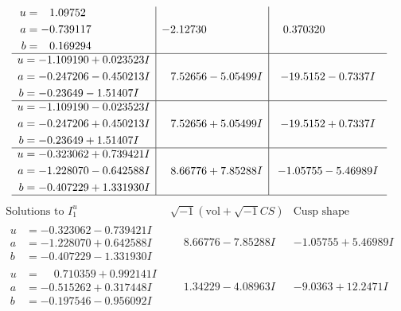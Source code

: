 \documentclass[1p]{elsarticle_modified}
\theoremstyle{definition}
\newcommand{\I}{\sqrt{-1}}
\begin{document}
$$\begin{array}{c|c|c}
\begin{aligned}
u &= \phantom{-}1.09752\phantom{ +0.000000I} \\
a &= -0.739117\phantom{ +0.000000I} \\
b &= \phantom{-}0.169294\phantom{ +0.000000I}\end{aligned}
 & -2.12730\phantom{ +0.000000I} & \phantom{-}0.370320\phantom{ +0.000000I} \\ \hline\begin{aligned}
u &= -1.109190 + 0.023523 I \\
a &= -0.247206 - 0.450213 I \\
b &= -0.23649 - 1.51407 I\end{aligned}
 & \phantom{-}7.52656 - 5.05499 I & -19.5152 - 0.7337 I \\ \hline\begin{aligned}
u &= -1.109190 - 0.023523 I \\
a &= -0.247206 + 0.450213 I \\
b &= -0.23649 + 1.51407 I\end{aligned}
 & \phantom{-}7.52656 + 5.05499 I & -19.5152 + 0.7337 I \\ \hline\begin{aligned}
u &= -0.323062 + 0.739421 I \\
a &= -1.228070 - 0.642588 I \\
b &= -0.407229 + 1.331930 I\end{aligned}
 & \phantom{-}8.66776 + 7.85288 I & -1.05755 - 5.46989 I\\
 \hline 
 \end{array}$$\newpage$$\begin{array}{c|c|c}  
\text{Solutions to }I^u_{1}& \I (\text{vol} + \sqrt{-1}CS) & \text{Cusp shape}\\
 \hline 
\begin{aligned}
u &= -0.323062 - 0.739421 I \\
a &= -1.228070 + 0.642588 I \\
b &= -0.407229 - 1.331930 I\end{aligned}
 & \phantom{-}8.66776 - 7.85288 I & -1.05755 + 5.46989 I \\ \hline\begin{aligned}
u &= \phantom{-}0.710359 + 0.992141 I \\
a &= -0.515262 + 0.317448 I \\
b &= -0.197546 - 0.956092 I\end{aligned}
 & \phantom{-}1.34229 - 4.08963 I & -9.0363 + 12.2471 I \\ \hline\begin{aligned}

\end{aligned}
\end{array}$$
\end{document}
